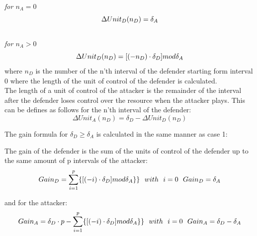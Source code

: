 \textit{for $n_{A} = 0$}
\begin{equation}\label{first}
\Delta Unit_{D}(n_{D}) = \delta_{A} \\
\end{equation}
\\ 
\textit{for $n_{A} > 0$}
\begin{equation}\label{first}
\Delta Unit_{D}(n_{D}) =  [( - n_{D}  ) \cdot \delta_{D}] mod \delta_{A}\\
\end{equation}
where $n_{D}$ is the number of the n'th interval of the defender starting form interval 0 where the length of the unit of control of the defender is calculated.\\

The length of a unit of control of the attacker is the remainder of the interval after the defender loses control over the resource when the attacker plays. This can be defines as follows for the n'th interval of the defender:
\begin{equation}\label{first}
\Delta Unit_{A}(n_{D}) = \delta_{D} - \Delta Unit_{D}(n_{D})
\end{equation}

The gain formula for $\delta_{D} \geq \delta_{A}$ is calculated in the same manner as case 1:

The gain of the defender is the sum of the units of control of the defender up to the same amount of p intervals of the attacker:
\begin{equation}\label{first}
Gain_{D} =\sum_{i=1}^{p} \lbrace [( - i ) \cdot \delta_{D}] mod \delta_{A} \rbrace  \rbrace ~~with~~ i=0 ~~ Gain_{D}=\delta_{A}\\ 
\end{equation}

and for the attacker:
\begin{equation}\label{first}
Gain_{A} =\delta_{D} \cdot p - \sum_{i=1}^{p} \lbrace [( - i ) \cdot \delta_{D}] mod \delta_{A} \rbrace  \rbrace ~~with~~ i=0 ~~ Gain_{A}=\delta_{D} - \delta_{A}\\ 
\end{equation}

